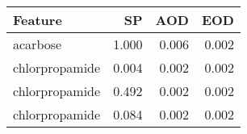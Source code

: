 \begin{tabular}{lrrr}
\toprule
Feature & SP & AOD & EOD \\
\midrule
acarbose & 1.000 & 0.006 & 0.002 \\
chlorpropamide & 0.004 & 0.002 & 0.002 \\
chlorpropamide & 0.492 & 0.002 & 0.002 \\
chlorpropamide & 0.084 & 0.002 & 0.002 \\
\bottomrule
\end{tabular}
